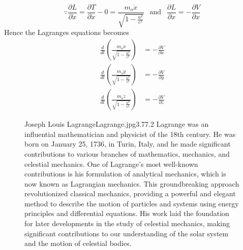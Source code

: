 \[
\because \frac{\partial L}{\partial \dot{x}} = \frac{\partial T}{\partial \dot{x}} - 0 = \frac{m_o \dot{x}}{\sqrt{1 - \frac{u^2}{c^2}}}
\ \ \text{ and } \ \ \frac{\partial L}{\partial x} = -\frac{\partial V}{\partial x}
\]
Hence the  Lagranges equations becomes
\begin{align*}
    \frac{d}{dt} \left(\frac{m_o \dot{x}}{\sqrt{1 - \frac{u^2}{c^2}}}\right) &= -\frac{\partial V}{\partial x}\\
    \frac{d}{dt} \left(\frac{m_o \dot{y}}{\sqrt{1 - \frac{u^2}{c^2}}}\right) &= -\frac{\partial V}{\partial y}\\
    \frac{d}{dt} \left(\frac{m_o \dot{z}}{\sqrt{1 - \frac{u^2}{c^2}}}\right) &= -\frac{\partial V}{\partial z}
\end{align*}
\begin{figure}[b]
\begin{enrichment}{Joseph Louis Lagrange}{Lagrange.jpg}{3}{.77}{.2}
    Lagrange was an influential mathematician and physicist of the 18th century. He was born on January 25, 1736, in Turin, Italy, and he made significant contributions to various branches of mathematics, mechanics, and celestial mechanics.
    One of Lagrange's most well-known contributions is his formulation of analytical mechanics, which is now known as Lagrangian mechanics. This groundbreaking approach revolutionized classical mechanics, providing a powerful and elegant method to describe the motion of particles and systems using energy principles and differential equations. His work laid the foundation for later developments in the study of celestial mechanics, making significant contributions to our understanding of the solar system and the motion of celestial bodies.
\end{enrichment}
\end{figure}
\newpage
